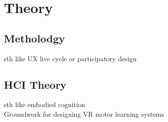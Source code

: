 \chapter{Theory}
\section{Metholodgy}
sth like UX live cycle or participatory design
\section{HCI Theory}
sth like embodied cognition\\
Groundwork for designing VR motor learning systems
